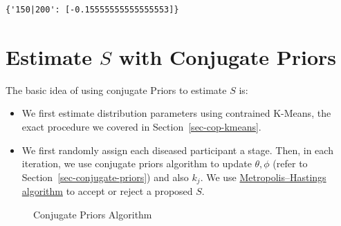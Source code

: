 \documentclass[
  letterpaper,
  DIV=11,
  numbers=noendperiod]{scrreprt}
\providecommand{\tightlist}{%
  \setlength{\itemsep}{0pt}\setlength{\parskip}{0pt}}\usepackage{longtable,booktabs,array}
\begin{document}
\begin{verbatim}
{'150|200': [-0.15555555555555553]}
\end{verbatim}


\chapter{\texorpdfstring{Estimate \(S\) with Conjugate
Priors}{Estimate S with Conjugate Priors}}\label{sec-estS-conjugate-priors}

The basic idea of using conjugate Priors to estimate \(S\) is:

\begin{itemize}
\tightlist
\item
  We first estimate distribution parameters using contrained K-Means,
  the exact procedure we covered in Section~\ref{sec-cop-kmeans}.
\item
  We first randomly assign each diseased participant a stage. Then, in
  each iteration, we use conjugate priors algorithm to update
  \(\theta, \phi\) (refer to Section~\ref{sec-conjugate-priors}) and
  also \(k_j\). We use
  \href{https://en.wikipedia.org/wiki/Metropolis\%E2\%80\%93Hastings_algorithm}{Metropolis--Hastings
  algorithm} to accept or reject a proposed \(S\).
\end{itemize}

\begin{figure}


\caption{\label{fig-cp-algo}Conjugate Priors Algorithm}

\end{figure}%
\end{document}
